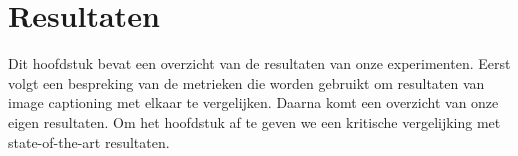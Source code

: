 \chapter{Resultaten} %
\label{cha:resultaten}
Dit hoofdstuk bevat een overzicht van de resultaten van onze experimenten. Eerst volgt een bespreking van de metrieken die worden gebruikt om resultaten van image captioning met elkaar te vergelijken. Daarna komt een overzicht van onze eigen resultaten. Om het hoofdstuk af te geven we een kritische vergelijking met state-of-the-art resultaten.
